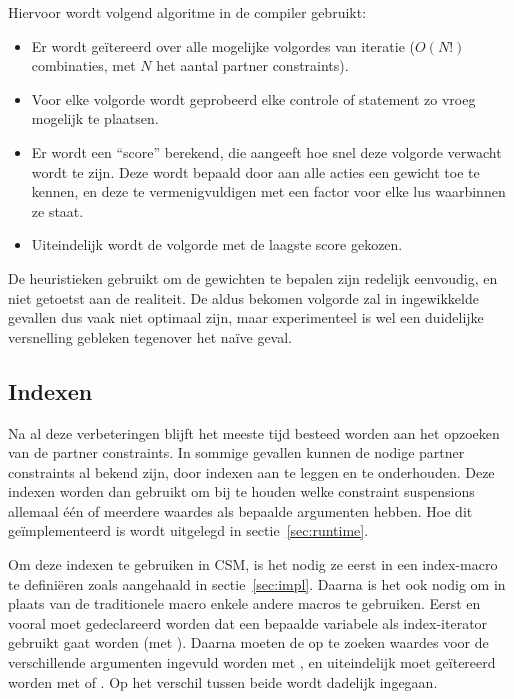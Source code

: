 Hiervoor wordt volgend algoritme in de compiler gebruikt: \begin{itemize}
  \item Er wordt ge\"itereerd over alle mogelijke volgordes van iteratie ($O(N!)$ combinaties, met $N$ het aantal partner constraints).
  \item Voor elke volgorde wordt geprobeerd elke controle of statement zo vroeg mogelijk te plaatsen.
  \item Er wordt een ``score'' berekend, die aangeeft hoe snel deze volgorde verwacht wordt te zijn. Deze wordt bepaald door aan alle acties een gewicht toe te kennen, en deze te vermenigvuldigen met een factor voor elke lus waarbinnen ze staat.
  \item Uiteindelijk wordt de volgorde met de laagste score gekozen.
\end{itemize}
De heuristieken gebruikt om de gewichten te bepalen zijn redelijk eenvoudig, en niet getoetst aan de realiteit. De aldus bekomen volgorde zal in ingewikkelde gevallen dus vaak niet optimaal zijn, maar experimenteel is wel een duidelijke versnelling gebleken tegenover het na\"ive geval.

\subsection{Indexen} \label{gencode-index}


Na al deze verbeteringen blijft het meeste tijd besteed worden aan het opzoeken van de partner constraints. In sommige gevallen kunnen de nodige partner constraints al bekend zijn, door indexen aan te leggen en te onderhouden. Deze indexen worden dan gebruikt om bij te houden welke constraint suspensions allemaal \'e\'en of meerdere waardes als bepaalde argumenten hebben. Hoe dit ge\"implementeerd is wordt uitgelegd in sectie~\ref{sec:runtime}.

Om deze indexen te gebruiken in CSM, is het nodig ze eerst in een index-macro te defini\"eren zoals aangehaald in sectie~\ref{sec:impl}. Daarna is het ook nodig om in plaats van de traditionele  macro enkele andere macros te gebruiken. Eerst en vooral moet gedeclareerd worden dat een bepaalde variabele als index-iterator gebruikt gaat worden (met ). Daarna moeten de op te zoeken waardes voor de verschillende argumenten ingevuld worden met , en uiteindelijk moet ge\"itereerd worden met  of . Op het verschil tussen beide wordt dadelijk ingegaan.

